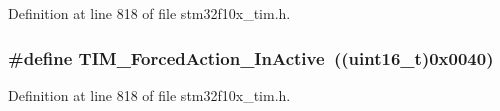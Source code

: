 Definition at line 818 of file stm32f10x\+\_\+tim.\+h.

\subsubsection[{\texorpdfstring{T\+I\+M\+\_\+\+Forced\+Action\+\_\+\+In\+Active}{TIM_ForcedAction_InActive}}]{\setlength{\rightskip}{0pt plus 5cm}\#define T\+I\+M\+\_\+\+Forced\+Action\+\_\+\+In\+Active~(({\bf uint16\+\_\+t})0x0040)}\hypertarget{group___t_i_m___forced___action_ga79656f2193ec5e12a15d0ae5b025d273}{}\label{group___t_i_m___forced___action_ga79656f2193ec5e12a15d0ae5b025d273}


Definition at line 818 of file stm32f10x\+\_\+tim.\+h.

